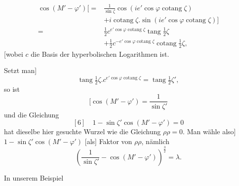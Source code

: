 \[
\begin{aligned}
\cos(M'-\varphi')\bigl[={}&\frac1{\sin\zeta}
 \cos(ie'\cos\varphi\operatorname{cotang}\zeta)\\
&+i\operatorname{cotang}\zeta\mathord{.}
 \sin(ie'\cos\varphi\operatorname{cotang}\zeta)\bigr]\\
={}&\tfrac12c^{e'\cos\varphi\operatorname{cotang}\zeta}\operatorname{tang}\tfrac12\zeta\\
&+\tfrac12c^{-e'\cos\varphi\operatorname{cotang}\zeta}\operatorname{cotang}\tfrac12\zeta,
\end{aligned}
\]
[wobei \(c\) die Basis der hyperbolischen Logarithmen ist.
\par\noindent\hspace*{\parindent}Setzt man]
\[
\operatorname{tang}\tfrac12\zeta\mathord{.}c^{e'\cos\varphi\operatorname{cotang}\zeta}
 =\operatorname{tang}\tfrac12\zeta',
\]
so ist
\[
[\cos(M'-\varphi')=\frac1{\sin\zeta'}
\]
und die Gleichung
\[
[6]\quad1-\sin\zeta'\cos(M'-\varphi')=0
\]
hat dieselbe hier gesuchte Wurzel wie die Gleichung \(\rho\rho=0\). Man wähle also]
\(1-\sin\zeta'\cos(M'-\varphi')\) [als] Faktor von \(\rho\rho\), nämlich
\[
\left(\frac1{\sin\zeta'}-\cos(M'-\varphi')\right)^{\frac32}=\lambda.
\]
\par\noindent\hspace*{\parindent}In unserem Beispiel
